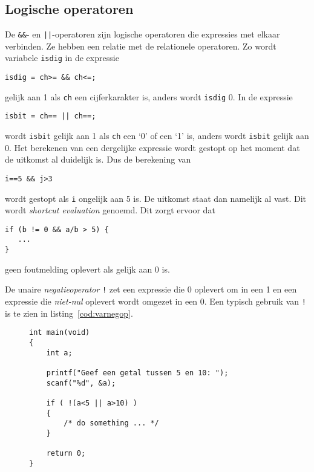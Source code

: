 \subsection{Logische operatoren}
De \texttt{\&\&}- en \texttt{||}-operatoren zijn logische operatoren die expressies met elkaar verbinden. Ze hebben een relatie met de relationele operatoren. Zo wordt variabele \texttt{isdig} in de expressie

\hspace*{1em}\texttt{isdig = ch>=\textquotesingle\ \&\& ch<=\textquotesingle;}

gelijk aan 1 als \texttt{ch} een cijferkarakter is, anders wordt \texttt{isdig} 0. In de expressie

\hspace*{1em}\texttt{isbit = ch==\textquotesingle\ || ch==\textquotesingle;}

wordt \texttt{isbit} gelijk aan 1 als \texttt{ch} een `0' of een `1' is, anders wordt \texttt{isbit} gelijk aan 0. Het berekenen van een dergelijke expressie wordt gestopt op het moment dat de uitkomst al duidelijk is. Dus de berekening van

\hspace*{1em}\texttt{i==5 \&\& j>3}

wordt gestopt als \texttt{i} ongelijk aan 5 is. De uitkomst staat dan namelijk al vast. Dit wordt \textsl{shortcut evaluation} genoemd. Dit zorgt ervoor dat

\begin{lstlisting}[style=lstoneline]
if (b != 0 && a/b > 5) {
   ...
}
\end{lstlisting}

geen foutmelding oplevert als  gelijk aan 0 is.

De unaire \textsl{negatieoperator} \texttt{!} zet een expressie die 0 oplevert om in een 1 en een expressie die \textsl{niet-nul} oplevert wordt omgezet in een 0. Een typisch gebruik van \texttt{!} is te zien in listing~\ref{cod:varnegop}.

\begin{figure}[!ht]
\begin{lstlisting}[caption=Voorbeeld van de negatieoperator.,label=cod:varnegop]
int main(void)
{
    int a;
    
    printf("Geef een getal tussen 5 en 10: ");
    scanf("%d", &a);
    
    if ( !(a<5 || a>10) )
    {
        /* do something ... */
    }

    return 0;
}
\end{lstlisting}
\end{figure}

